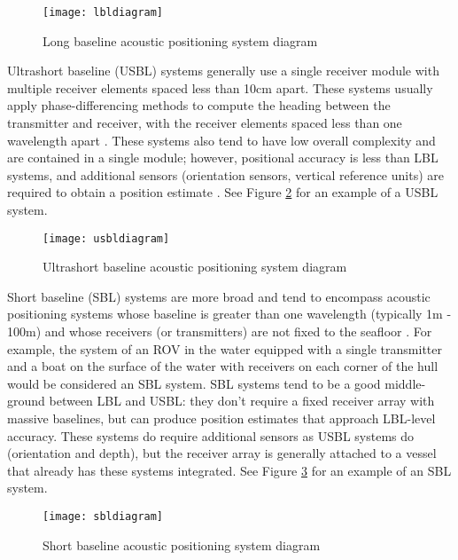 \documentclass[11pt]{ucthesisCP}
\begin{document}
\begin{figure}[htbp]
	\centering
	\texttt{[image: lbldiagram]}
	\caption{Long baseline acoustic positioning system diagram \cite{practicaloverview}}
	\label{fig:lbldiagram}
\end{figure}

Ultrashort baseline (USBL) systems generally use a single receiver module with multiple receiver elements spaced less than 10cm apart. These systems usually apply phase-differencing methods to compute the heading between the transmitter and receiver, with the receiver elements spaced less than one wavelength apart \cite{apomab}. These systems also tend to have low overall complexity and are contained in a single module; however, positional accuracy is less than LBL systems, and additional sensors (orientation sensors, vertical reference units) are required to obtain a position estimate \cite{practicaloverview}. See Figure \ref{fig:usbldiagram} for an example of a USBL system.

\begin{figure}[htbp]
	\centering
	\texttt{[image: usbldiagram]}
	\caption{Ultrashort baseline acoustic positioning system diagram \cite{practicaloverview}}
	\label{fig:usbldiagram}
\end{figure}

Short baseline (SBL) systems are more broad and tend to encompass acoustic positioning systems whose baseline is greater than one wavelength (typically 1m - 100m) and whose receivers (or transmitters) are not fixed to the seafloor \cite{surveyurpn}. For example, the system of an ROV in the water equipped with a single transmitter and a boat on the surface of the water with receivers on each corner of the hull would be considered an SBL system. SBL systems tend to be a good middle-ground between LBL and USBL: they don’t require a fixed receiver array with massive baselines, but can produce position estimates that approach LBL-level accuracy. These systems do require additional sensors as USBL systems do (orientation and depth), but the receiver array is generally attached to a vessel that already has these systems integrated. See Figure \ref{fig:sbldiagram} for an example of an SBL system.

\begin{figure}[htbp]
	\centering
	\texttt{[image: sbldiagram]}
	\caption{Short baseline acoustic positioning system diagram \cite{practicaloverview}}
	\label{fig:sbldiagram}
\end{figure}
\end{document}
